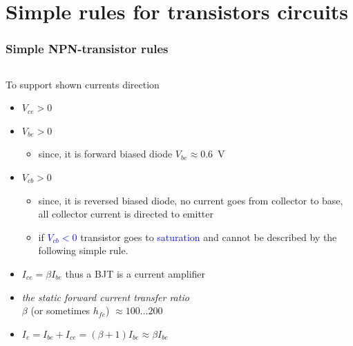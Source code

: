 \documentclass[beamer]{standalone}
\begin{document}
\section{Simple rules for transistors circuits} 
\begin{frame}
\frametitle{Simple NPN-transistor rules}
\begin{columns}[t]
	\begin{column}{.75\textwidth}
		To support shown currents direction
		\begin{itemize}
			\item<2-> \alert{$V_{ce} > 0$}
			\item<3-> \alert{$V_{be} > 0$}
				\begin{itemize}
					\item since, it is forward biased diode $V_{be} \approx 0.6$~V
				\end{itemize}
			\item<4-> \alert{$V_{cb} > 0$}
				\begin{itemize}
					\item since, it is reversed biased diode, no current goes from
						collector to base, all collector current is directed to emitter 
					\item if \textcolor{blue}{$V_{cb} < 0$} transistor goes to
						\textcolor{blue}{saturation} and cannot be
						described by the following simple rule.
				\end{itemize}
		\end{itemize}
		\begin{itemize}
			\item<6-> \alert{$I_{ce}=\beta I_{be}$} thus a BJT is a current
				amplifier
			\item<7-> {\it the static forward current transfer ratio}\\
				$\beta$ (or sometimes $h_{fe}$)   $\approx 100 \ldots 200$ 
			\item<8-> $I_e = I_{be} + I_{ce} = (\beta+1) I_{be} \approx \beta I_{be}$
		\end{itemize}


\end{column}
\end{columns}
\end{frame}
\end{document}
